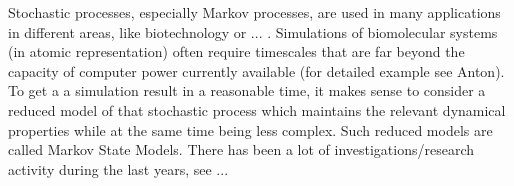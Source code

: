 




Stochastic processes, especially Markov processes, are used in many applications in different areas, like biotechnology or ... . Simulations of biomolecular systems (in atomic representation) often require timescales that are far beyond the capacity of computer power currently available (for detailed example see Anton).
To get a a simulation result in a reasonable time, it makes sense to consider a reduced model of that stochastic process which maintains the relevant dynamical properties while at the same time being less complex. Such reduced models are called Markov State Models. There has been a lot of investigations/research activity during the last years, see ...

